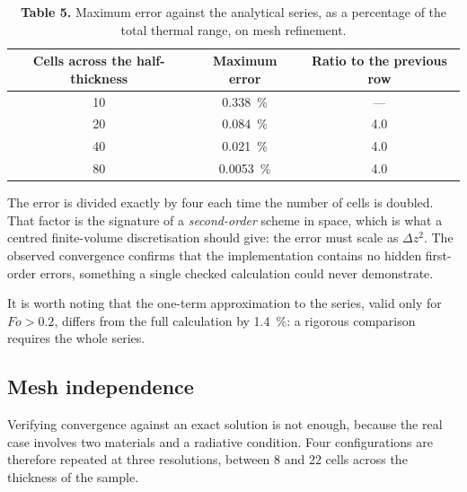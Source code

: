 \documentclass[11pt,a4paper]{article}
\begin{document}
\begin{table}[htbp]
\centering
\caption*{\textcolor{uji}{\textbf{Table 5.}} Maximum error against the
analytical series, as a percentage of the total thermal range, on mesh
refinement.}
\begin{tabular}{ccc}
\toprule
Cells across the half-thickness & Maximum error & Ratio to the previous row \\
\midrule
\num{10} & \SI{0.338}{\percent} & --- \\
\num{20} & \SI{0.084}{\percent} & \num{4.0} \\
\num{40} & \SI{0.021}{\percent} & \num{4.0} \\
\num{80} & \SI{0.0053}{\percent} & \num{4.0} \\
\bottomrule
\end{tabular}
\end{table}

The error is divided exactly by four each time the number of cells is
doubled. That factor is the signature of a \emph{second-order} scheme in
space, which is what a centred finite-volume discretisation should give:
the error must scale as $\Delta z^{2}$. The observed convergence confirms
that the implementation contains no hidden first-order errors, something a
single checked calculation could never demonstrate.

It is worth noting that the one-term approximation to the series, valid
only for $Fo > \num{0.2}$, differs from the full calculation by
\SI{1.4}{\percent}: a rigorous comparison requires the whole series.

\subsection{Mesh independence}

Verifying convergence against an exact solution is not enough, because the
real case involves two materials and a radiative condition. Four
configurations are therefore repeated at three resolutions, between \num{8}
and \num{22} cells across the thickness of the sample.
\end{document}
